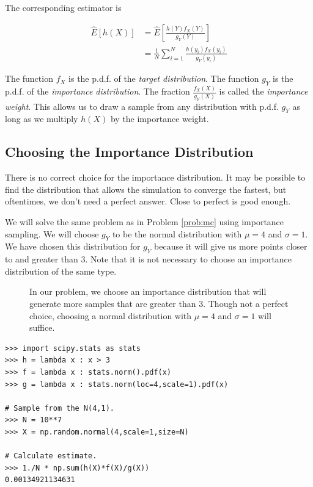 The corresponding estimator is

\begin{equation}\label{eq:imp_estimator}
\begin{split}
\widehat{E}[h(X)] & = \widehat{E}\left [ \frac{h(Y)f_X(Y)}{g_Y(Y)}\right ] \\
& = \frac{1}{N}\sum_{i = 1}^{N}\frac{h(y_i)f_X(y_i)}{g_Y(y_i)}
\end{split}
\end{equation}

The function $f_X$ is the p.d.f. of the \emph{target distribution}. The function $g_Y$ is the p.d.f. of the \emph{importance distribution}. The fraction $\frac{f_X(X)}{g_Y(X)}$ is called the \emph{importance weight}. This allows us to draw a sample from any distribution with p.d.f. $g_Y$ as long as we multiply $h(X)$ by the importance weight. 

\subsection*{Choosing the Importance Distribution}
There is no correct choice for the importance distribution. It may be possible to find the distribution that allows the simulation to converge the fastest, but oftentimes, we don't need a perfect answer. Close to perfect is good enough.

We will solve the same problem as in Problem \ref{prob:mc} using importance sampling. We will choose $g_Y$ to be the normal distribution with $\mu = 4$ and $\sigma = 1$. 
We have chosen this distribution for $g_Y$ because it will give us more points closer to and greater than 3. Note that it is not necessary to choose an importance distribution of the same type.

\begin{figure}[H]
\caption{In our problem, we choose an importance distribution that will generate more samples that are greater than 3. Though not a perfect choice, choosing a normal distribution with $\mu = 4$ and $\sigma = 1$ will suffice.}
\label{fig:importance}
\end{figure}

\begin{lstlisting}
>>> import scipy.stats as stats
>>> h = lambda x : x > 3
>>> f = lambda x : stats.norm().pdf(x)
>>> g = lambda x : stats.norm(loc=4,scale=1).pdf(x)

# Sample from the N(4,1).
>>> N = 10**7
>>> X = np.random.normal(4,scale=1,size=N)

# Calculate estimate.
>>> 1./N * np.sum(h(X)*f(X)/g(X))
0.00134921134631
\end{lstlisting}

